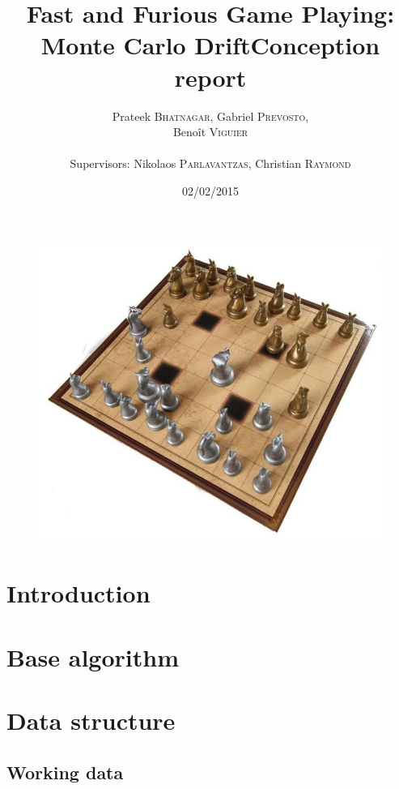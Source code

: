 \documentclass[12pt]{article}
\title{Fast and Furious Game Playing: Monte Carlo Drift\smallbreak Conception report} %
\author{Prateek \textsc{Bhatnagar}, Gabriel \textsc{Prevosto}, \\
        Benoît \textsc{Viguier} \\
        \\
        Supervisors: Nikolaos \textsc{Parlavantzas}, Christian \textsc{Raymond}}
\date{02/02/2015}
\begin{document}
\maketitle

\begin{figure}[!h] 
\centerline{\includegraphics[scale=0.50]{Pictures/arimaa}}
\end{figure}
\newpage

\tableofcontents
\newpage


\section{Introduction}				\label{sec:introduction} 		

\newpage
\section{Base algorithm}			\label{sec:Algo}			

\newpage
\section{Data structure}
	\subsection{Working data}		\label{sec:working}			
\end{document}
